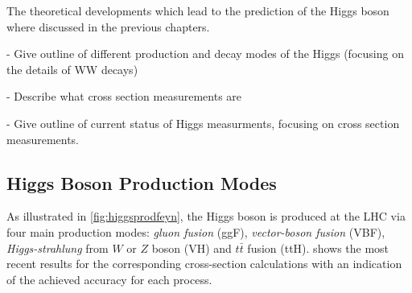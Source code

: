 


The theoretical developments which lead to the prediction of the Higgs boson where discussed in the previous chapters.

- Give outline of different production and decay modes of the Higgs (focusing on the details of WW decays)

- Describe what cross section measurements are 

- Give outline of current status of Higgs measurments, focusing on cross section measurements.


\subsection{Higgs Boson Production Modes}
\label{sec:higgsprod}
As illustrated in \cref{fig:higgsprodfeyn}, the Higgs boson is produced at the LHC via four main production modes: \emph{gluon fusion} (ggF), \emph{vector-boson fusion} (VBF), \emph{Higgs-strahlung} from $W$ or $Z$ boson (VH) and $t\bar{t}$ fusion (ttH).
 shows the most recent results for the corresponding cross-section calculations with an indication of the achieved accuracy for each process.

